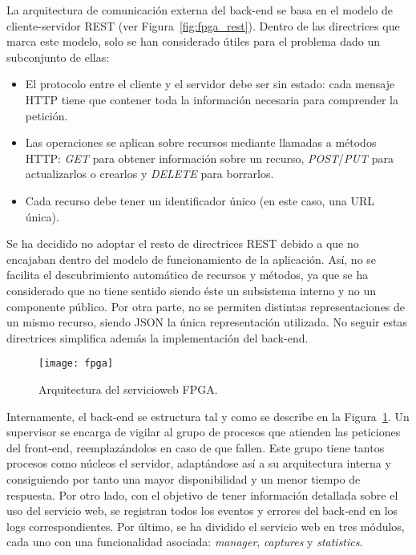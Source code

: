 La arquitectura de comunicación externa del \gls{back-end} se basa en el modelo de cliente-servidor \gls{REST} (ver Figura~\ref{fig:fpga_rest}).
Dentro de las directrices que marca este modelo, solo se han considerado útiles para el problema dado un subconjunto de ellas:
\begin{itemize}
  \item El protocolo entre el cliente y el servidor debe ser sin estado: cada mensaje \gls{HTTP} tiene que contener toda la información necesaria para comprender la petición.
  \item Las operaciones se aplican sobre recursos mediante llamadas a métodos \gls{HTTP}: \textit{GET} para obtener información sobre un recurso, \textit{POST}/\textit{PUT} para actualizarlos o crearlos y \textit{DELETE} para borrarlos.
  \item Cada recurso debe tener un identificador único (en este caso, una \gls{URL} única).
\end{itemize}

Se ha decidido no adoptar el resto de directrices \gls{REST} debido a que no encajaban dentro del modelo de funcionamiento de la aplicación.
Así, no se facilita el descubrimiento automático de recursos y métodos, ya que se ha considerado que no tiene sentido siendo éste un subsistema interno y no un componente público.
Por otra parte, no se permiten distintas representaciones de un mismo recurso, siendo \gls{JSON} la única representación utilizada.
No seguir estas directrices simplifica además la implementación del \gls{back-end}.

\begin{figure}[!htp]
  \centering
  \texttt{[image: fpga]}
  \caption{Arquitectura del \gls{servicioweb} \gls{FPGA}.}
  \label{fig:arquitectura_servicio}
\end{figure}

Internamente, el \gls{back-end} se estructura tal y como se describe en la Figura~\ref{fig:arquitectura_servicio}.
Un supervisor se encarga de vigilar al grupo de procesos que atienden las peticiones del \gls{front-end}, reemplazándolos en caso de que fallen.
Este grupo tiene tantos procesos como núcleos el servidor, adaptándose así a su arquitectura interna y consiguiendo por tanto una mayor disponibilidad y un menor tiempo de respuesta.
Por otro lado, con el objetivo de tener información detallada sobre el uso del servicio web, se registran todos los eventos y errores del \gls{back-end} en los \glspl{log} correspondientes.
Por último, se ha dividido el servicio web en tres módulos, cada uno con una funcionalidad asociada: \textit{manager}, \textit{captures} y \textit{statistics}.


